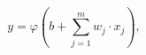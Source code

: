 \begin{equation}
y = \varphi(b + \sum_{j = 1}^{m}{w_j \cdot x_j}),
 \label{eq:perceptron}
\end{equation}

